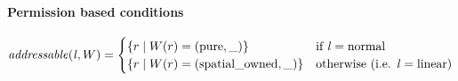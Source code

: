
\paragraph{Permission based conditions}
\[
  \addressable{\lin,W} =
  \begin{cases}
    \{ r \mid W(r) = (\pure,\_) \} & \text{if $\lin = \normal$} \\
    \{ r \mid W(r) = (\spatialo,\_) \}  & \text{otherwise (i.e. $\lin = \linear$)} \\
  \end{cases}
\]


